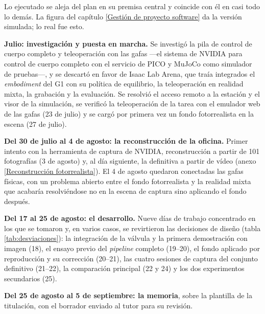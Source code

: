 Lo ejecutado se aleja del plan en su premisa central y coincide con él en casi todo lo demás. La
figura del capítulo \ref{Gestión de proyecto software} da la versión simulada; lo real fue esto.

\textbf{Julio: investigación y puesta en marcha.} Se investigó la pila de control de cuerpo completo
y teleoperación con las gafas —el sistema de NVIDIA para control de cuerpo completo con el
servicio de PICO y MuJoCo como simulador de pruebas—, y se descartó en favor de Isaac Lab Arena,
que traía integrados el \textit{embodiment} del G1 con su política de equilibrio, la teleoperación
en realidad mixta, la grabación y la evaluación. Se resolvió el acceso remoto a la estación y el
visor de la simulación, se verificó la teleoperación de la tarea con el emulador web de las gafas
(23 de julio) y se cargó por primera vez un fondo fotorrealista en la escena (27 de julio).

\textbf{Del 30 de julio al 4 de agosto: la reconstrucción de la oficina.} Primer intento con la
herramienta de captura de NVIDIA, reconstrucción a partir de 101 fotografías (3 de agosto) y,
al día siguiente, la definitiva a partir de vídeo (anexo \ref{Reconstrucción fotorrealista}). El 4
de agosto quedaron conectadas las gafas físicas, con un problema abierto entre el fondo
fotorrealista y la realidad mixta que acabaría resolviéndose no en la escena de captura sino
aplicando el fondo después.

\textbf{Del 17 al 25 de agosto: el desarrollo.} Nueve días de trabajo concentrado en los que se
tomaron y, en varios casos, se revirtieron las decisiones de diseño (tabla \ref{tab:desviaciones}):
la integración de la válvula y la primera demostración con imagen (18), el ensayo previo del
\textit{pipeline} completo (19--20), el fondo aplicado por reproducción y su corrección (20--21),
las cuatro sesiones de captura del conjunto definitivo (21--22), la comparación principal (22 y
24) y los dos experimentos secundarios (25).

\textbf{Del 25 de agosto al 5 de septiembre: la memoria}, sobre la plantilla de la titulación,
con el borrador enviado al tutor para su revisión.

